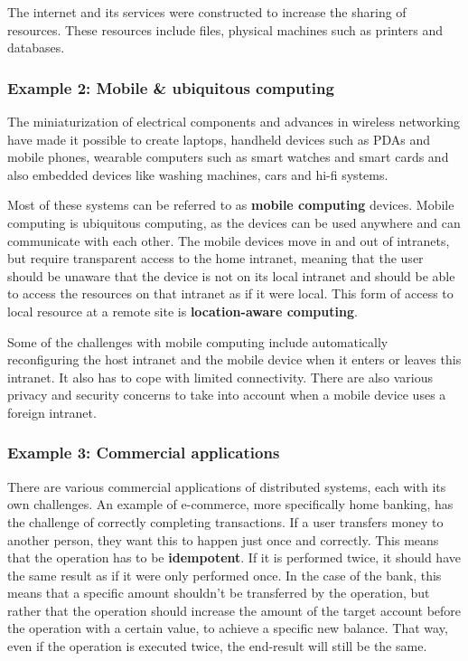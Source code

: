 \documentclass[a4paper]{article}
\begin{document}
The internet and its services were constructed to increase the sharing of resources. These resources include files, physical machines such as printers and databases.

\subsubsection{Example 2: Mobile \& ubiquitous computing}

The miniaturization of electrical components and advances in wireless networking have made it possible to create laptops, handheld devices such as PDAs and mobile phones, wearable computers such as smart watches and smart cards and also embedded devices like washing machines, cars and hi-fi systems.

Most of these systems can be referred to as \textbf{mobile computing} devices. Mobile computing is ubiquitous computing, as the devices can be used anywhere and can communicate with each other. The mobile devices move in and out of intranets, but require transparent access to the home intranet, meaning that the user should be unaware that the device is not on its local intranet and should be able to access the resources on that intranet as if it were local. This form of access to local resource at a remote site is \textbf{location-aware computing}.

Some of the challenges with mobile computing include automatically reconfiguring the host intranet and the mobile device when it enters or leaves this intranet. It also has to cope with limited connectivity. There are also various privacy and security concerns to take into account when a mobile device uses a foreign intranet.

\subsubsection{Example 3: Commercial applications}

There are various commercial applications of distributed systems, each with its own challenges. An example of e-commerce, more specifically home banking, has the challenge of correctly completing transactions. If a user transfers money to another person, they want this to happen just once and correctly. This means that the operation has to be \textbf{idempotent}. If it is performed twice, it should have the same result as if it were only performed once. In the case of the bank, this means that a specific amount shouldn't be transferred by the operation, but rather that the operation should increase the amount of the target account before the operation with a certain value, to achieve a specific new balance. That way, even if the operation is executed twice, the end-result will still be the same.
\end{document}
